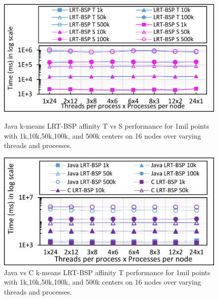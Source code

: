 \documentclass[10pt, conference, compsocconf]{IEEEtran}
\begin{document}
\begin{figure}[!htb]
    \begin{minipage}{0.49\textwidth}
        \centering
        \includegraphics[width=1\columnwidth]{images/fig_kmeans_1mil_varying_centers_BSP_T_vs_BSP_S_Java}
		\caption{Java k-means \ac{LRT-BSP} affinity T vs S performance for 1mil points with 1k,10k,50k,100k, and 500k centers on 16 nodes over varying threads and processes.}
		\label{fig:images/fig_kmeans_1mil_varying_centers_BSP_T_C_vs_Java}
    \end{minipage}
    \hspace{1.4mm}
    \begin{minipage}{0.49\textwidth}
        \centering
        \includegraphics[width=1\columnwidth]{images/fig_kmeans_1mil_varying_centers_BSP_T_C_vs_Java}
		\caption{Java vs C k-means \ac{LRT-BSP} affinity T performance for 1mil points with 1k,10k,50k,100k, and 500k centers on 16 nodes over varying threads and processes.}
		\label{fig:images/fig_kmeans_1mil_varying_centers_BSP_T_C_vs_Java}
    \end{minipage}   
\end{figure}
\end{document}
